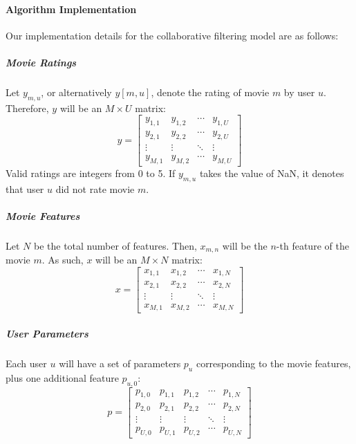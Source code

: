 \documentclass[a4paper,9pt]{article}
\begin{document}
\paragraph{Algorithm Implementation}
Our implementation details for the collaborative filtering model are as follows:

\subparagraph{Movie Ratings}
Let \( y_{m,u} \), or alternatively \( y[m,u] \), denote the rating of movie \( m \) by user \( u \). Therefore, \( y \) will be an \( M \times U \) matrix:
\begin{equation}
	y =
	\begin{bmatrix}
		y_{1,1} & y_{1,2} & \cdots & y_{1,U} \\
		y_{2,1} & y_{2,2} & \cdots & y_{2,U} \\
		\vdots  & \vdots  & \ddots & \vdots  \\
		y_{M,1} & y_{M,2} & \cdots & y_{M,U}
	\end{bmatrix} \tag{4}
\end{equation}
Valid ratings are integers from 0 to 5. If \( y_{m,u} \) takes the value of NaN, it denotes that user \( u \) did not rate movie \( m \).

\subparagraph{Movie Features}
Let \( N \) be the total number of features. Then, \( x_{m,n} \) will be the \( n \)-th feature of the movie \( m \). As such, \( x \) will be an \( M \times N \) matrix:
\begin{equation}
	x =
	\begin{bmatrix}
		x_{1,1} & x_{1,2} & \cdots & x_{1,N} \\
		x_{2,1} & x_{2,2} & \cdots & x_{2,N} \\
		\vdots  & \vdots  & \ddots & \vdots  \\
		x_{M,1} & x_{M,2} & \cdots & x_{M,N}
	\end{bmatrix} \tag{5}
\end{equation}

\subparagraph{User Parameters}
Each user \( u \) will have a set of parameters \( p_u \) corresponding to the movie features, plus one additional feature \( p_{u,0} \):
\begin{equation}
	p =
	\begin{bmatrix}
		p_{1,0} & p_{1,1} & p_{1,2} & \cdots & p_{1,N} \\
		p_{2,0} & p_{2,1} & p_{2,2} & \cdots & p_{2,N} \\
		\vdots  & \vdots  & \vdots  & \ddots & \vdots  \\
		p_{U,0} & p_{U,1} & p_{U,2} & \cdots & p_{U,N}
	\end{bmatrix} \tag{6}
\end{equation}
\end{document}
